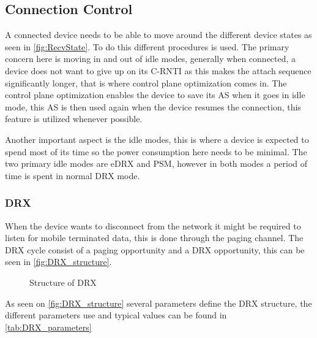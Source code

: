 \subsection{Connection Control}
A connected device needs to be able to move around the different device states as seen in \autoref{fig:RecvState}. To do this different procedures is used. The primary concern here is moving in and out of idle modes, generally when connected, a device does not want to give up on its \gls{C-RNTI} as this makes the attach sequence significantly longer, that is where control plane optimization comes in. The control plane optimization enables the device to save its \gls{AS} when it goes in idle mode, this \gls{AS} is then used again when the device resumes the connection, this feature is utilized whenever possible. 

Another important aspect is the idle modes, this is where a device is expected to spend most of its time so the power consumption here needs to be minimal. The two primary idle modes are \gls{eDRX} and \gls{PSM}, however in both modes a period of time is spent in normal DRX mode. 


\subsubsection{DRX}
When the device wants to disconnect from the network it might be required to listen for mobile terminated data, this is done through the paging channel. The DRX cycle consist of a paging opportunity and a DRX opportunity, this can be seen in \autoref{fig:DRX_structure}. 

\begin{figure}[H]
\centering
%
\caption{Structure of \gls{DRX}}
\label{fig:DRX_structure}
\end{figure}

As seen on \autoref{fig:DRX_structure} several parameters define the DRX structure, the different parameters use and typical values can be found in \autoref{tab:DRX_parameters}

